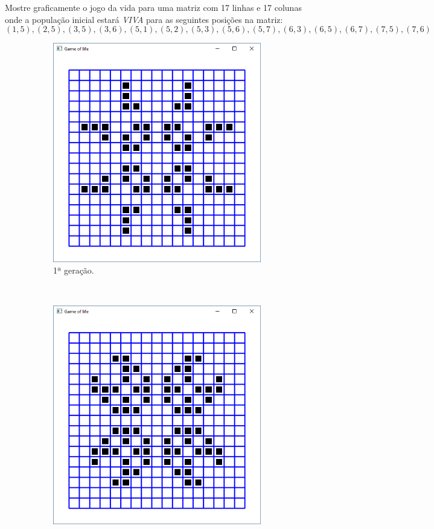 \begin{renumerate}
  Mostre graficamente o jogo da vida para uma matriz com 17 linhas e 17 colunas onde a população inicial estará \emph{VIVA} para as seguintes posições na matriz:
  $$
    (1,5), (2,5), (3,5), (3,6), (5,1), (5,2), (5,3), (5,6), (5,7), (6,3), (6,5), (6,7), (7,5), (7,6)
  $$
  \label{ex:cap02_ex2}

     \begin{figure}[H]
    \centering
    \begin{subfigure}[t]{0.27\textwidth}
        \centerline{\includegraphics[width=.9\textwidth]{img/cap2_ex9.png}}
        \caption{1ª geração.}
        \label{fig:cap03_ex9a}
    \end{subfigure}
    ~
    \begin{subfigure}[t]{0.27\textwidth}
        \centerline{\includegraphics[width=.9\textwidth]{img/cap2_ex9b.png}}

\end{subfigure}
\end{figure}
\end{renumerate}
